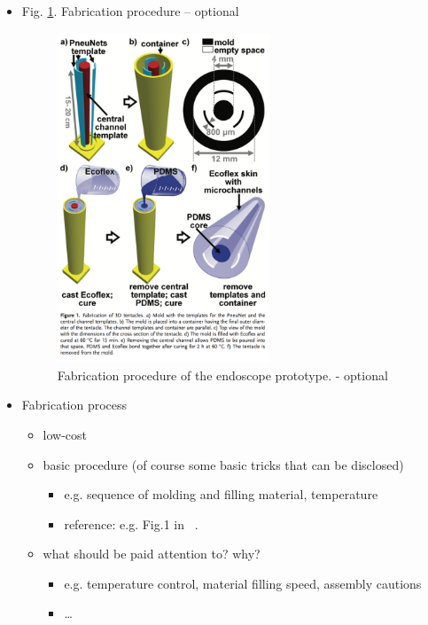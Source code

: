 \documentclass[journal,onecolumn]{IEEEtran}
\begin{document}
\begin{itemize}
\item Fig. \ref{fig:org65c33a6}. Fabrication procedure -- optional

\begin{figure}[!h]
\centering
\includegraphics[width=0.6\textwidth]{./fig/fig-fabrication.png}
\caption{\label{fig:org65c33a6}
Fabrication procedure of the endoscope prototype. - optional}
\end{figure}

\item Fabrication process
\begin{itemize}
\item low-cost
\item basic procedure (of course some basic tricks that can be disclosed)
\begin{itemize}
\item e.g. sequence of molding and filling material, temperature
\item reference: e.g.  Fig.1 in ~\cite{martinez2012robotic}.
\end{itemize}
\item what should be paid attention to? why?
\begin{itemize}
\item e.g. temperature control, material filling speed, assembly cautions
\item \ldots{}
\end{itemize}
\end{itemize}
\end{itemize}
\end{document}

